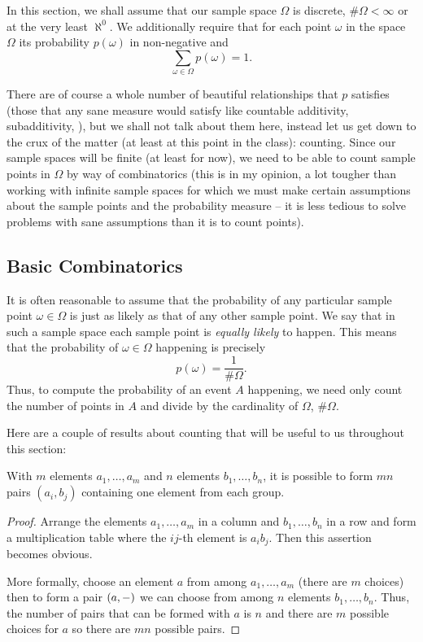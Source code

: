 In this section, we shall assume that our sample space \(\Omega\) is
discrete,\ie{} \(\#\Omega<\infty\) or at the very least \(\aleph^0\). We
additionally require that for each point \(\omega\) in the space \(\Omega\)
its probability \(p(\omega)\) in non-negative and
\begin{equation}
  \label{eq:convention-prob}
  \sum_{\omega\in\Omega}p(\omega)=1.
\end{equation}

There are of course a whole number of beautiful relationships that \(p\)
satisfies (those that any sane measure would satisfy like countable
additivity, subadditivity, \etc{}), but we shall not talk about them here,
instead let us get down to the crux of the matter (at least at this point
in the class): counting. Since our sample spaces will be finite (at least
for now), we need to be able to count sample points in \(\Omega\) by way of
combinatorics (this is in my opinion, a lot tougher than working with
infinite sample spaces for which we must make certain assumptions about the
sample points and the probability measure -- it is less tedious to solve
problems with sane assumptions than it is to count points).

\subsection{Basic Combinatorics}
It is often reasonable to assume that the probability of any particular
sample point \(\omega\in\Omega\) is just as likely as that of any other
sample point. We say that in such a sample space each sample point is
\emph{equally likely} to happen. This means that the probability of
\(\omega\in\Omega\) happening is precisely
\[
  p(\omega)=\frac{1}{\#\Omega}.
\]
Thus, to compute the probability of an event \(A\) happening, we need only
count the number of points in \(A\) and divide by the cardinality of
\(\Omega\), \(\#\Omega\).

Here are a couple of results about counting that will be useful to us
throughout this section:
\begin{lemma}
  With \(m\) elements \(a_1,\dotsc,a_m\) and \(n\) elements
  \(b_1,\dotsc,b_n\), it is possible to form \(mn\) pairs \((a_i,b_j)\)
  containing one element from each group.
\end{lemma}
\begin{proof}
  Arrange the elements \(a_1,\dotsc,a_m\) in a column and
  \(b_1,\dotsc,b_n\) in a row and form a multiplication table where the
  \(ij\)-th element is \(a_ib_j\). Then this assertion becomes obvious.

  More formally, choose an element \(a\) from among \(a_1,\dotsc,a_m\)
  (there are \(m\) choices) then to form a pair \((a,{-})\) we can
  choose from among \(n\) elements \(b_1,\dotsc,b_n\). Thus, the number of
  pairs that can be formed with \(a\) is \(n\) and there are \(m\) possible
  choices for \(a\) so there are \(mn\) possible pairs.
\end{proof}



